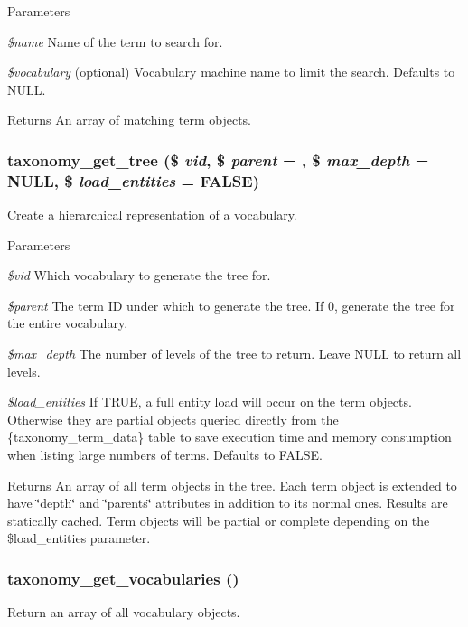 \begin{DoxyParams}{Parameters}
\item[{\em \$name}]Name of the term to search for. \item[{\em \$vocabulary}](optional) Vocabulary machine name to limit the search. Defaults to NULL.\end{DoxyParams}
\begin{DoxyReturn}{Returns}
An array of matching term objects. 
\end{DoxyReturn}
\hypertarget{taxonomy_8module_a8b1f135528885e6d843585a665ea1594}{
\subsubsection[{taxonomy\_\-get\_\-tree}]{\setlength{\rightskip}{0pt plus 5cm}taxonomy\_\-get\_\-tree (\$ {\em vid}, \/  \$ {\em parent} = {}, \/  \$ {\em max\_\-depth} = {\ttfamily NULL}, \/  \$ {\em load\_\-entities} = {\ttfamily FALSE})}}
\label{taxonomy_8module_a8b1f135528885e6d843585a665ea1594}
Create a hierarchical representation of a vocabulary.


\begin{DoxyParams}{Parameters}
\item[{\em \$vid}]Which vocabulary to generate the tree for. \item[{\em \$parent}]The term ID under which to generate the tree. If 0, generate the tree for the entire vocabulary. \item[{\em \$max\_\-depth}]The number of levels of the tree to return. Leave NULL to return all levels. \item[{\em \$load\_\-entities}]If TRUE, a full entity load will occur on the term objects. Otherwise they are partial objects queried directly from the \{taxonomy\_\-term\_\-data\} table to save execution time and memory consumption when listing large numbers of terms. Defaults to FALSE.\end{DoxyParams}
\begin{DoxyReturn}{Returns}
An array of all term objects in the tree. Each term object is extended to have \char`\"{}depth\char`\"{} and \char`\"{}parents\char`\"{} attributes in addition to its normal ones. Results are statically cached. Term objects will be partial or complete depending on the \$load\_\-entities parameter. 
\end{DoxyReturn}
\hypertarget{taxonomy_8module_a61d3c2b09ef0247494b33fa01d8dafaa}{
\subsubsection[{taxonomy\_\-get\_\-vocabularies}]{\setlength{\rightskip}{0pt plus 5cm}taxonomy\_\-get\_\-vocabularies ()}}
\label{taxonomy_8module_a61d3c2b09ef0247494b33fa01d8dafaa}
Return an array of all vocabulary objects.

